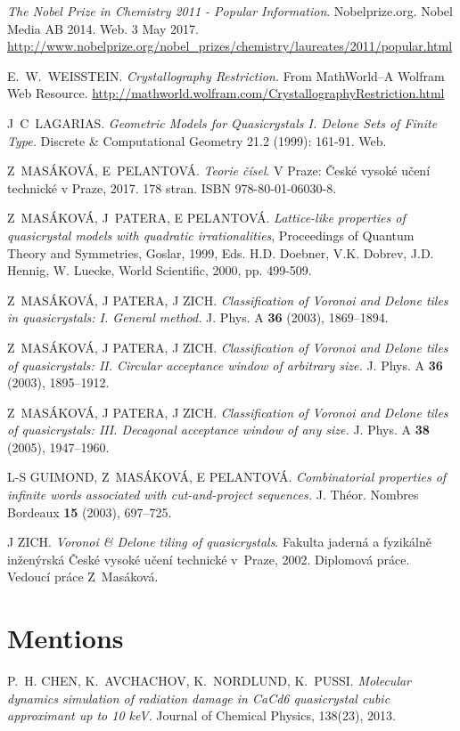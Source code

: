 \documentclass[text.tex]{subfiles}
\begin{document}
\begin{thebibliography}{9}

\emph{The Nobel Prize in Chemistry 2011 - Popular Information}. Nobelprize.org. Nobel Media AB 2014. Web. 3 May 2017. \url{http://www.nobelprize.org/nobel_prizes/chemistry/laureates/2011/popular.html}

\uppercase{E.~W.~Weisstein}. \emph{Crystallography Restriction.} From MathWorld--A Wolfram Web Resource. \url{http://mathworld.wolfram.com/CrystallographyRestriction.html}

J~C~LAGARIAS. \emph{Geometric Models for Quasicrystals I. Delone Sets of Finite Type.} Discrete \& Computational Geometry 21.2 (1999): 161-91. Web.

Z~MASÁKOVÁ, E~PELANTOVÁ. \emph{Teorie čísel}. V Praze: České vysoké učení technické v Praze, 2017. 178 stran. ISBN 978-80-01-06030-8.

Z~MASÁKOVÁ, J~PATERA, E PELANTOVÁ. \emph{Lattice-like properties of quasicrystal models with quadratic irrationalities},  Proceedings of Quantum Theory and Symmetries, Goslar, 1999, Eds. H.D. Doebner, V.K. Dobrev, J.D. Hennig, W. Luecke, World Scientific, 2000, pp. 499-509.

	Z~MASÁKOVÁ, J PATERA, J ZICH. \emph{Classification of Voronoi and Delone tiles in quasicrystals: I. General method.} J. Phys. A \textbf{36} (2003), 1869--1894.

	Z~MASÁKOVÁ, J PATERA, J ZICH. \emph{Classification of Voronoi and Delone tiles of quasicrystals: II. Circular acceptance window of arbitrary size.} J. Phys. A \textbf{36} (2003), 1895--1912.

	Z~MASÁKOVÁ, J PATERA, J ZICH. \emph{Classification of Voronoi and Delone tiles of quasicrystals: III. Decagonal acceptance window of any size.} J. Phys. A \textbf{38} (2005), 1947--1960.

	L-S GUIMOND, Z~MASÁKOVÁ, E PELANTOVÁ. \emph{Combinatorial properties of infinite words associated with cut-and-project
 sequences.} J. Théor. Nombres Bordeaux \textbf{15} (2003), 697--725.
	
	J ZICH. \emph{Voronoi \& Delone tiling of quasicrystals}. Fakulta jaderná a fyzikálně inženýrská České vysoké učení technické v~Praze, 2002. Diplomová práce. Vedoucí práce Z~Masáková.

\section*{Mentions}
\uppercase{P.~H. Chen, K.~Avchachov, K.~Nordlund, K.~Pussi.} 
\emph {Molecular dynamics simulation of radiation damage in CaCd6 quasicrystal cubic approximant up to 10 keV}. {Journal of Chemical Physics}, {138}({23}), {2013}.


\end{thebibliography}
\end{document}
